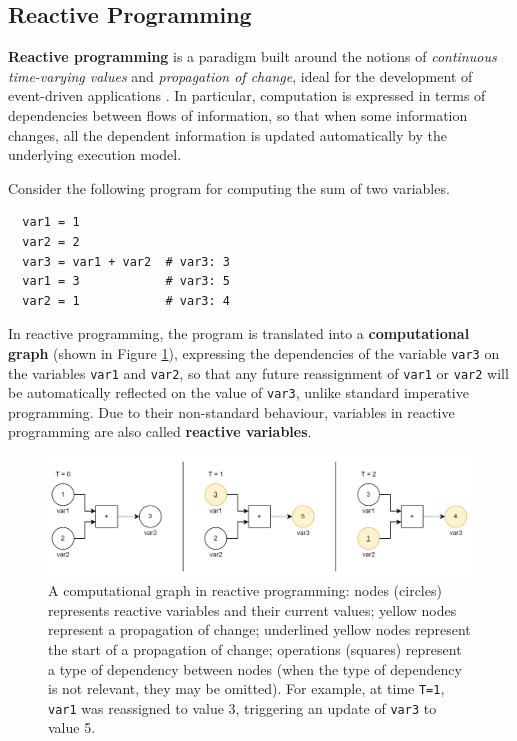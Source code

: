 
\subsection{Reactive Programming}
\label{section:background:concepts:reactive-programming}

\textbf{Reactive programming} is a paradigm built around the notions of
\textit{continuous time-varying values} and \textit{propagation of change},
ideal for the development of event-driven applications
\cite{ReactiveProgramming}. In particular, computation is expressed in terms of
dependencies between flows of information, so that when some information
changes, all the dependent information is updated automatically by the
underlying execution model.

Consider the following program for computing the sum of two variables.

\begin{lstlisting}
  var1 = 1
  var2 = 2
  var3 = var1 + var2  # var3: 3
  var1 = 3            # var3: 5
  var2 = 1            # var3: 4
\end{lstlisting}

In reactive programming, the program is translated into a \textbf{computational
graph} (shown in Figure \ref{figure:dependency-graph}), expressing the
dependencies of the variable \texttt{var3} on the variables \texttt{var1} and
\texttt{var2}, so that any future reassignment of \texttt{var1} or
\texttt{var2} will be automatically reflected on the value of \texttt{var3},
unlike standard imperative programming. Due to their non-standard behaviour,
variables in reactive programming are also called \textbf{reactive variables}.

\begin{figure}[h]
  \centering
  \includegraphics[width=\textwidth]{resources/figures/dependency-graph.png}
  \caption{
    A computational graph in reactive programming: nodes (circles) represents
    reactive variables and their current values; yellow nodes represent a
    propagation of change; underlined yellow nodes represent the
    start of a propagation of change; operations (squares) represent a type
    of dependency between nodes (when the type of dependency is not relevant,
    they may be omitted). For example, at time \texttt{T=1}, \texttt{var1} was
    reassigned to value 3, triggering an update of \texttt{var3} to value 5.
  }
  \label{figure:dependency-graph}
\end{figure}

